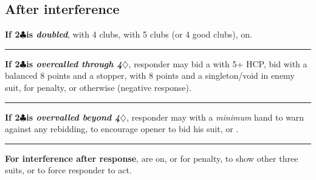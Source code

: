 \documentclass[oneside]{memoir}
\def\C{$\clubsuit$}
\def\D{$\diamondsuit$}
\begin{document}
\subsection{After interference}
\iffalse %
\begin{ptable}\headings{0-4|5-7|8+}
\multicolumn4c{After double (other responses on)}\\
\row{4 clubs}\bid(0-8,lblue){pass}\\
\row{5 clubs (4 good clubs)}\bid(0-8,lyellow){redouble}\\
\multicolumn4c{After overcall beyond 4\D}\\
\row{good 6-card or longer suit}\bid(0-7,lorange){double}
  \bid(8,lyellow){bid suit}\\
\row{want to hear opener's suit}\bid*(0-4,lorange){double}
  \bid(5-8,lred){pass}\\
\end{ptable}\hfill
\begin{ptable}\headings{0-4|5-7|8+}
\multicolumn4c{After overcall through 4\D}\\
\row{5-card suit}\bid*(0-4,lorange){pass}\bid(5-8,lgreen){bid suit}\\
\row{long enemy suit}\bid*(0-4,lorange){pass}\bid(5-8,laqua){penalty double}\\
\row{balanced + 1 stopper}\bid*(0-7,lorange){pass}\bid(8,lred){NT}\\
\row{\singleton/void in enemy suit}\bid(0-7,lorange){\clift{pass}}
  \bid(8,lpurple){cue-bid}\\
\end{ptable}
\fi

\noindent \textbf{If 2\C is \emph{doubled}}, 
with 4 clubs,  with 5 clubs (or 4 good
clubs),  on.
\vskip0.25pc\hrule\vskip0.25pc
\noindent \textbf{If 2\C is \emph{overcalled through 4\D}}, responder may bid a
 with 5+ HCP, bid 
with a balanced 8 points and a stopper, 
with 8 points and a singleton/void in enemy suit, 
for penalty, or  otherwise (negative response).
\vskip0.25pc\hrule\vskip0.25pc
\noindent \textbf{If 2\C is \emph{overvalled beyond 4\D}}, responder may
 with a \emph{minimum} hand to warn against any
rebidding,  to encourage opener to bid his suit,
or .
\vskip0.25pc\hrule\vskip0.25pc
\noindent \textbf{For interference after response},
 are on,  or
 for penalty,  to show
other three suits, or  to force responder
to act.
\end{document}

